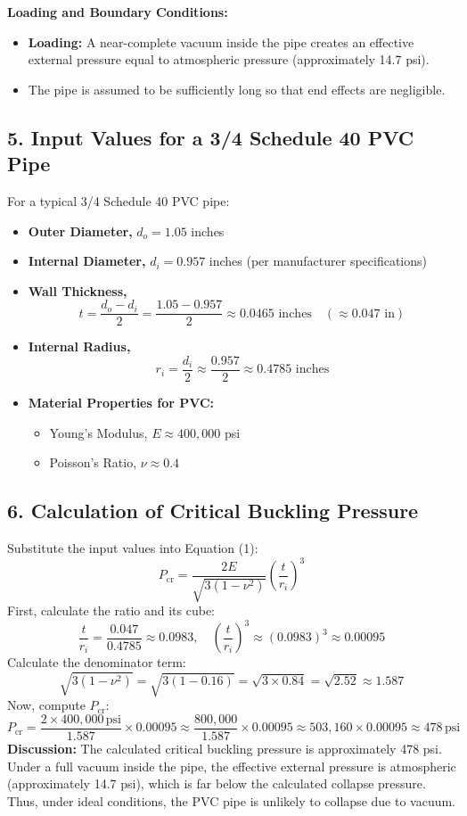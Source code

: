 \documentclass[12pt]{article}
\begin{document}
\noindent\textbf{Loading and Boundary Conditions:}
\begin{itemize}
    \item \textbf{Loading:} A near-complete vacuum inside the pipe creates an effective external pressure equal to atmospheric pressure (approximately 14.7 psi).
    \item The pipe is assumed to be sufficiently long so that end effects are negligible.
\end{itemize}

\subsection*{5. Input Values for a 3/4 Schedule 40 PVC Pipe}
For a typical 3/4 Schedule 40 PVC pipe:
\begin{itemize}
    \item \textbf{Outer Diameter,} \(d_o = 1.05\) inches
    \item \textbf{Internal Diameter,} \(d_i = 0.957\) inches (per manufacturer specifications)
    \item \textbf{Wall Thickness,} 
    \[
    t = \frac{d_o - d_i}{2} = \frac{1.05 - 0.957}{2} \approx 0.0465 \text{ inches} \quad (\approx 0.047 \text{ in})
    \]
    \item \textbf{Internal Radius,} 
    \[
    r_i = \frac{d_i}{2} \approx \frac{0.957}{2} \approx 0.4785 \text{ inches}
    \]
    \item \textbf{Material Properties for PVC:}
    \begin{itemize}
        \item Young's Modulus, \(E \approx 400{,}000\) psi
        \item Poisson's Ratio, \(\nu \approx 0.4\)
    \end{itemize}
\end{itemize}

\subsection*{6. Calculation of Critical Buckling Pressure}
Substitute the input values into Equation (1):
\[
P_{\text{cr}} = \frac{2E}{\sqrt{3(1-\nu^2)}} \left(\frac{t}{r_i}\right)^3
\]
First, calculate the ratio and its cube:
\[
\frac{t}{r_i} = \frac{0.047}{0.4785} \approx 0.0983, \quad \left(\frac{t}{r_i}\right)^3 \approx (0.0983)^3 \approx 0.00095
\]
Calculate the denominator term:
\[
\sqrt{3(1-\nu^2)} = \sqrt{3(1-0.16)} = \sqrt{3 \times 0.84} = \sqrt{2.52} \approx 1.587
\]
Now, compute \(P_{\text{cr}}\):
\[
P_{\text{cr}} = \frac{2 \times 400{,}000\,\text{psi}}{1.587} \times 0.00095 \approx \frac{800{,}000}{1.587} \times 0.00095 \approx 503{,}160 \times 0.00095 \approx 478\,\text{psi}
\]
\textbf{Discussion:}  
The calculated critical buckling pressure is approximately 478 psi. Under a full vacuum inside the pipe, the effective external pressure is atmospheric (approximately 14.7 psi), which is far below the calculated collapse pressure. Thus, under ideal conditions, the PVC pipe is unlikely to collapse due to vacuum. 
\end{document}
